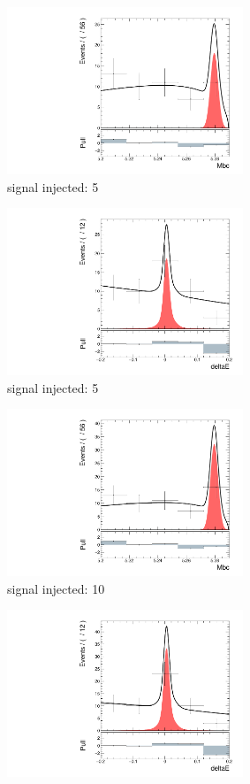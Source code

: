\begin{figure}[H]
	
	\begin{subfigure}{0.5\linewidth}
		\includegraphics[page=1,height=5cm]{figures/injection_sig_5/ds_gen_Mbc_2D.pdf}
		\caption{signal injected: 5}
	\end{subfigure}
	\begin{subfigure}{0.5\linewidth}
		\includegraphics[page=1,height=5cm]{figures/injection_sig_5/ds_gen_deltaE_2D.pdf}
		\caption{signal injected: 5}
	\end{subfigure}
	\begin{subfigure}{0.5\linewidth}
		\includegraphics[page=1,height=5cm]{figures/injection_sig_10/ds_gen_Mbc_2D.pdf}
		\caption{signal injected: 10}
	\end{subfigure}
	\begin{subfigure}{0.5\linewidth}
		\includegraphics[page=1,height=5cm]{figures/injection_sig_10/ds_gen_deltaE_2D.pdf}

\end{subfigure}
\end{figure}
